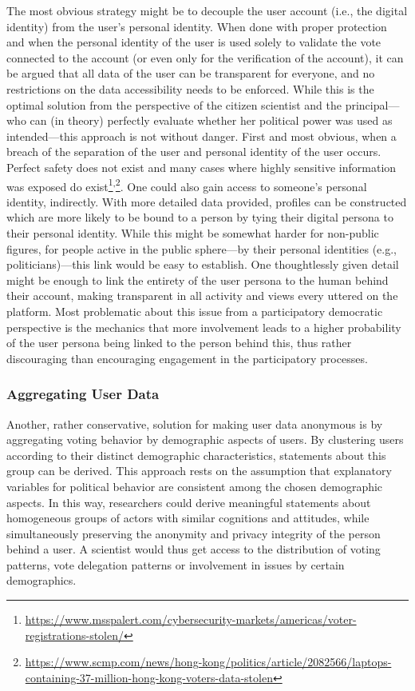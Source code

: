 The most obvious strategy might be to decouple the user account (i.e., the digital identity) from the user’s personal identity. When done with proper protection and when the personal identity of the user is used solely to validate the vote connected to the account (or even only for the verification of the account), it can be argued that all data of the user can be transparent for everyone, and no restrictions on the data accessibility needs to be enforced. While this is the optimal solution from the perspective of the citizen scientist and the principal---who can (in theory) perfectly evaluate whether her political power was used as intended---this approach is not without danger. First and most obvious, when a breach of the separation of the user and personal identity of the user occurs. Perfect safety does not exist and many cases where highly sensitive information was exposed do exist\footnote{\url{https://www.msspalert.com/cybersecurity-markets/americas/voter-registrations-stolen/}}\textsuperscript{,}\footnote{\url{https://www.scmp.com/news/hong-kong/politics/article/2082566/laptops-containing-37-million-hong-kong-voters-data-stolen}}. One could also gain access to someone’s personal identity, indirectly. With more detailed data provided, profiles can be constructed which are more likely to be bound to a person by tying their digital persona to their personal identity. While this might be somewhat harder for non-public figures, for people active in the public sphere---by their personal identities (e.g., politicians)---this link would be easy to establish. One thoughtlessly given detail might be enough to link the entirety of the user persona to the human behind their account, making transparent in all activity and views every uttered on the platform. 
Most problematic about this issue from a participatory democratic perspective is the mechanics that more involvement leads to a higher probability of the user persona being linked to the person behind this, thus rather discouraging than encouraging engagement in the participatory processes.

\subsubsection{Aggregating User Data}

Another, rather conservative, solution for making user data anonymous is by aggregating voting behavior by demographic aspects of users. By clustering users according to their distinct demographic characteristics, statements about this group can be derived. This approach rests on the assumption that explanatory variables for political behavior are consistent among the chosen demographic aspects. In this way, researchers could derive meaningful statements about homogeneous groups of actors with similar cognitions and attitudes, while simultaneously preserving the anonymity and privacy integrity of the person behind a user.
A scientist would thus get access to the distribution of voting patterns, vote delegation patterns or involvement in issues by certain demographics. 

